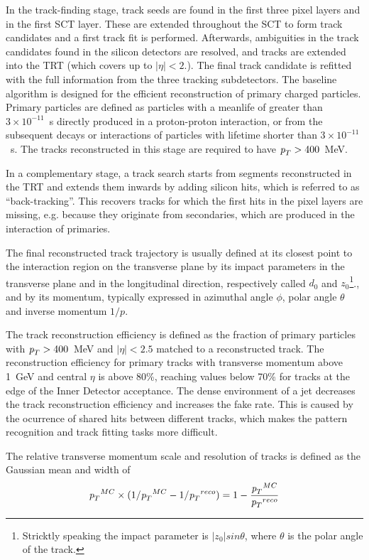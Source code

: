 \begin{itemize}
In the track-finding stage, track seeds are found in the first three pixel layers and in the first SCT layer. These are extended throughout the SCT to form track candidates and a first track fit is performed. Afterwards, ambiguities in the track candidates found in the silicon detectors are resolved, and tracks are extended into the TRT (which covers up to $|\eta|<2.$). The final track candidate is refitted with the full information from the three tracking subdetectors. The baseline algorithm is designed for the efficient reconstruction of primary charged particles. Primary particles are defined as particles with a meanlife of greater than $3 \times 10^{-11}$~s directly produced in a proton-proton interaction, or from the subsequent decays or interactions of particles with lifetime shorter than $3 \times 10^{-11}$~s. The tracks reconstructed in this stage are required to have ${\emph{p}_{T}}> 400$~MeV.

In a complementary stage, a track search starts from segments reconstructed in the TRT and extends them inwards by adding silicon hits, which is referred to as ``back-tracking''. This recovers tracks for which the first hits in the pixel layers are missing, e.g. because they originate from secondaries, which are produced in the interaction of primaries.

The final reconstructed track trajectory is usually defined at its closest point to the interaction region on the transverse plane by its impact parameters in the transverse plane and in the longitudinal direction, respectively called $d_0$ and $z_0$\footnote{Stricktly speaking the impact parameter is $|z_0|sin\theta$, where $\theta$ is the polar angle of the track.}., and by its momentum, typically expressed in azimuthal angle $\phi$, polar angle $\theta$ and inverse momentum $1/p$. 

 The track reconstruction efficiency is defined as the fraction of primary particles with ${\emph{p}_{T}}> 400$~MeV and $|\eta|<2.5$ matched to a reconstructed track. The reconstruction efficiency for primary tracks with transverse momentum above 1~GeV and central $\eta$ is above 80\%, reaching values below 70\% for tracks at the edge of the Inner Detector acceptance. %
The dense environment of a jet decreases the track reconstruction efficiency and increases the fake rate. This is caused by the ocurrence of shared hits between different tracks, which makes the pattern recognition and track fitting tasks more difficult.

The relative transverse momentum scale and resolution of tracks is defined as the Gaussian mean and width of
%
\begin{equation}
{\emph{p}_{T}}^{MC} \times (1/{\emph{p}_{T}}^{MC}  - 1/{\emph{p}_{T}}^{reco}) = 1 - \frac{{\emph{p}_{T}}^{MC}}{{\emph{p}_{T}}^{reco}}
\end{equation}


\end{itemize}
